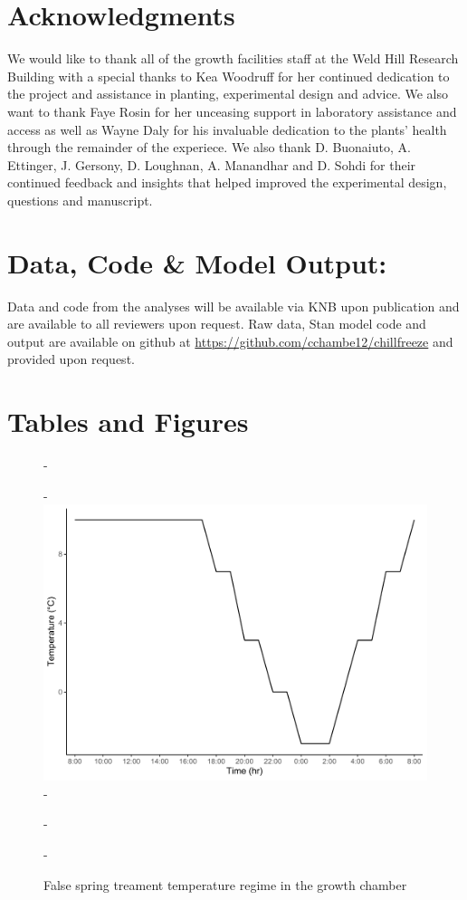 \documentclass{article}\usepackage[]{graphicx}\usepackage[]{color}
\begin{document}
\section*{Acknowledgments}

We would like to thank all of the growth facilities staff at the Weld Hill Research Building with a special thanks to Kea Woodruff for her continued dedication to the project and assistance in planting, experimental design and advice. We also want to thank Faye Rosin for her unceasing support in laboratory assistance and access as well as Wayne Daly for his invaluable dedication to the plants' health through the remainder of the experiece. We also thank D. Buonaiuto, A. Ettinger, J. Gersony, D. Loughnan, A. Manandhar and D. Sohdi for their continued feedback and insights that helped improved the experimental design, questions and manuscript.

\section*{Data, Code \& Model Output:}
Data and code from the analyses will be available via KNB upon publication and are available to all reviewers upon request. Raw data, {Stan} model code and output are available on github at \url{https://github.com/cchambe12/chillfreeze} and provided upon request.




\section*{Tables and Figures}

{\begin{figure} [H]
  -\begin{center}
  -\includegraphics[width=12cm]{..//analyses/figures/growthchamber.pdf}
  -\caption{False spring treament temperature regime in the growth chamber}\label{fig:gccond}
  -\end{center}
  -\end{figure}}
\end{document}
